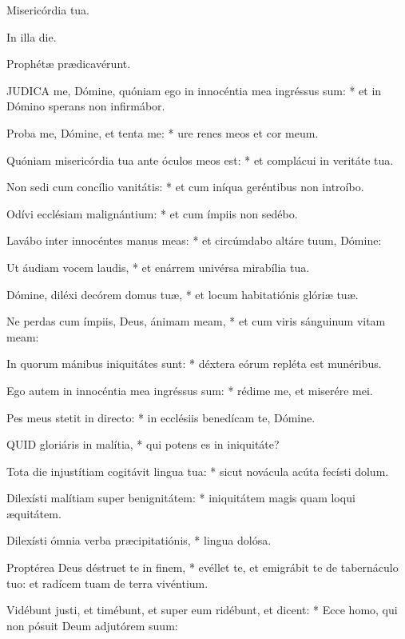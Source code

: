   Misericórdia tua.


  In illa die.

  Prophétæ prædicavérunt.


\lettrine[lines=2]{J}{UDICA} me, Dómine, quóniam ego in innocéntia mea ingréssus sum: * et in Dómino sperans non infirmábor.

Proba me, Dómine, et tenta me: * ure renes meos et cor meum.

Quóniam misericórdia tua ante óculos meos est: * et complácui in veritáte tua.

Non sedi cum concílio vanitátis: * et cum iníqua geréntibus non introíbo.

Odívi ecclésiam malignántium: * et cum ímpiis non sedébo.

Lavábo inter innocéntes manus meas: * et circúmdabo altáre tuum, Dómine:

Ut áudiam vocem laudis, * et enárrem univérsa mirabília tua.

Dómine, diléxi decórem domus tuæ, * et locum habitatiónis glóriæ tuæ.

Ne perdas cum ímpiis, Deus, ánimam meam, * et cum viris sánguinum vitam meam:

In quorum mánibus iniquitátes sunt: * déxtera eórum repléta est munéribus.

Ego autem in innocéntia mea ingréssus sum: * rédime me, et miserére mei.

Pes meus stetit in directo: * in ecclésiis benedícam te, Dómine.


\lettrine[lines=2]{Q}{UID} gloriáris in malítia, * qui potens es in iniquitáte?

Tota die injustítiam cogitávit lingua tua: * sicut novácula acúta fecísti dolum.

Dilexísti malítiam super benignitátem: * iniquitátem magis quam loqui æquitátem.

Dilexísti ómnia verba præcipitatiónis, * lingua dolósa.

Proptérea Deus déstruet te in finem, * evéllet te, et emigrábit te de tabernáculo tuo: et radícem tuam de terra vivéntium.

Vidébunt justi, et timébunt, et super eum ridébunt, et dicent: * Ecce homo, qui non pósuit Deum adjutórem suum:

